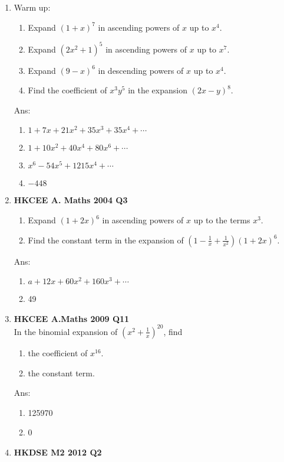 \documentclass[12pt]{article}
\begin{document}
\begin{enumerate}
	\item Warm up:
	\begin{enumerate}
		\item Expand $(1 + x)^7$ in ascending powers of $x$ up to $x^4$.
		\item Expand $(2x^2+1)^5$ in ascending powers of $x$ up to $x^7$.
		\item Expand $(9-x)^6$ in descending powers of $x$ up to $x^4$.
		\item Find the coefficient of $x^3y^5$ in the expansion $(2x-y)^8$. 
	\end{enumerate}
	Ans:
	\begin{enumerate}
		\item $1 + 7x + 21x^2 + 35x^3 + 35x^4 + \cdots$
		\item $1 + 10x^2 + 40x^4 + 80x^6 + \cdots$
		\item $x^6-54x^5+1215x^4+ \cdots$
		\item $-448$
	\end{enumerate}
	\item 
	\textbf{HKCEE A. Maths 2004 Q3}
	\begin{enumerate}
		\item Expand $(1+2x)^6$ in ascending powers of $x$ up to the terms $x^3$. 
		\item Find the constant term in the expansion of $\left(\displaystyle1 - \frac{1}{x} + \frac{1}{x^2}\right)(1+2x)^6$. 
	\end{enumerate}
	Ans:
	\begin{enumerate}
		\item $a + 12x + 60x^2 + 160x^3 + \cdots$
		\item 49
	\end{enumerate}
	\item 
	\textbf{HKCEE A.Maths 2009 Q11}\\
	In the binomial expansion of $\left(\displaystyle x^2 + \frac{1}{x}\right)^{20}$, find
	\begin{enumerate}
		\item the coefficient of $x^{16} $.
		\item the constant term.
	\end{enumerate}
	Ans:
	\begin{enumerate}
		\item 125970
		\item 0
	\end{enumerate}
	\item 
	\textbf{HKDSE M2 2012 Q2}\\

\end{enumerate}
\end{document}
